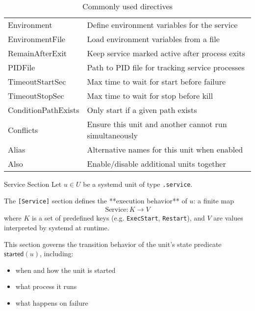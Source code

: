 \documentclass[openany, 12pt]{book}
\begin{document}
\begin{table}
\begin{center}
\begin{tabular}{ll}
      Environment         & Define environment variables for the service            \\
      EnvironmentFile     & Load environment variables from a file                  \\
      RemainAfterExit     & Keep service marked active after process exits          \\
      PIDFile             & Path to PID file for tracking service processes         \\
      TimeoutStartSec     & Max time to wait for start before failure               \\
      TimeoutStopSec      & Max time to wait for stop before kill                   \\
      ConditionPathExists & Only start if a given path exists                       \\
      Conflicts           & Ensure this unit and another cannot run simultaneously  \\
      Alias               & Alternative names for this unit when enabled            \\
      Also                & Enable/disable additional units together                \\
      \bottomrule
    \end{tabular}
  \end{center}
  \caption{Commonly used directives}
\end{table}

\begin{definition}{Service Section}{}
  Let $u \in U$ be a systemd unit of type \texttt{.service}.

  The \texttt{[Service]} section defines the **execution behavior** of $u$:
  a finite map
  \begin{align*}
    \text{Service} : K \to V
  \end{align*}
  where $K$ is a set of predefined keys (e.g. \texttt{ExecStart}, \texttt{Restart}),
  and $V$ are values interpreted by systemd at runtime.

  This section governs the transition behavior of the unit’s state predicate $\mathsf{started}(u)$,
  including:
  \begin{itemize}
    \item when and how the unit is started
    \item what process it runs
    \item what happens on failure
  \end{itemize}
\end{definition}
\end{document}
